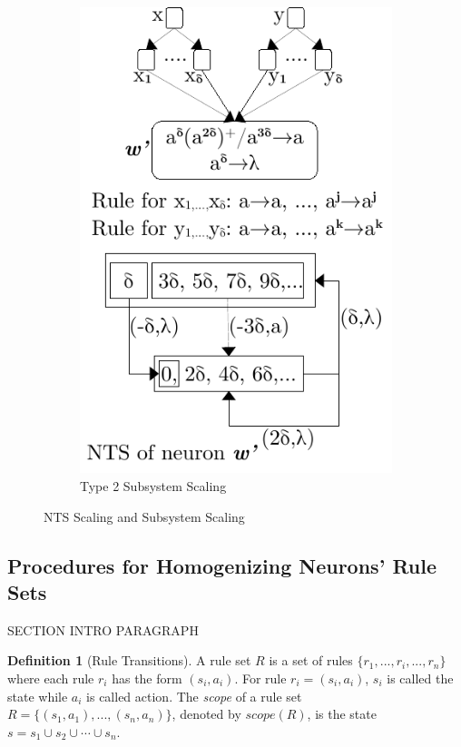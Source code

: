 \documentclass[]{elsarticle}
\theoremstyle{definition}
\newtheorem{definition2}{Definition}
\theoremstyle{definition}
\begin{document}
\begin{figure}[H]
\begin{subfigure}{.49\textwidth}
      \includegraphics[scale=0.65]{fig-lts-4b.pdf}
      \caption{Type 2 Subsystem Scaling}
      \label{fig-nts-4b}
   \end{subfigure}
   \caption{NTS Scaling and Subsystem Scaling}
   \label{fig-nts-4}
\end{figure}

\subsection{Procedures for Homogenizing Neurons' Rule Sets}\label{sec-homo-algo}

SECTION INTRO PARAGRAPH

\begin{definition2}[Rule Transitions]
A rule set $R$ is a set of rules $\{r_1,...,r_i,...,r_n\}$ where each rule $r_i$ has the form 
$(s_i,a_i)$. For rule $r_i=(s_i,a_i)$, $s_i$ is called the state while $a_i$ is called action.
The \emph{scope} of a rule set $R=\{(s_1,a_1),...,(s_n,a_n)\}$, denoted by $scope(R)$, is the state 
$s = s_1 \cup s_2 \cup \cdots \cup s_n$.
\end{definition2}
\end{document}
